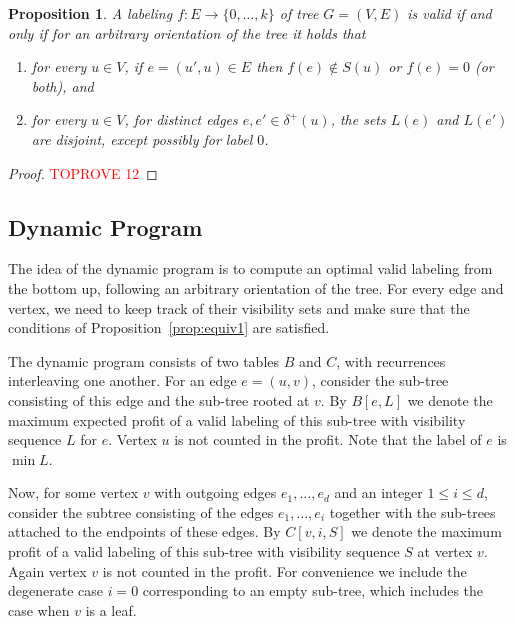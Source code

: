 \documentclass[11pt]{article}
\newtheorem{proposition}{Proposition}[section]
\newcommand\+{\mkern2mu}
\begin{document}
\begin{proposition} \label{prop: visibility}
    \label{prop:equiv1}
A labeling $f:E \to \{0, \ldots, k\}$ of tree $G=(V, E)$ is valid if and only if for an arbitrary orientation of the tree it holds that
    \begin{enumerate}
        \item for every $u \in V$, if $e=(u', u) \in E$ then $f(e) \not \in S(u)$ or $f(e) = 0$ (or both), and
        \item for every $u \in V$, for distinct edges $e, e' \in \delta^+(u)$, the sets $L(e)$ and $L(e')$ are disjoint, except possibly for label $0$.
    \end{enumerate}
\end{proposition}

\begin{proof}\textcolor{red}{TOPROVE 12}\end{proof}


\subsection{Dynamic Program}
The idea of the dynamic program is to compute an optimal valid labeling from the bottom up, following an arbitrary orientation of the tree. For every edge and vertex, we need to keep track of their visibility sets and make sure that the conditions of Proposition~\ref{prop:equiv1} are satisfied. 

The dynamic program consists of two tables $B$ and $C$, with recurrences interleaving one another. For an edge $e=(u,v)$, consider the sub-tree consisting of this edge and the sub-tree rooted at $v$. By $B[e,L]$ we denote the maximum expected profit of a valid labeling of this sub-tree with visibility sequence $L$ for $e$. Vertex $u$ is not counted in the profit. Note that the label of $e$ is $\min L$.

Now, for some vertex $v$ with outgoing edges $e_1, \ldots, e_d$ and an integer $1 \leq i \leq d$, consider the subtree consisting of the edges $e_1,\ldots,e_i$ together with the sub-trees attached to the endpoints of these edges. By $C[v,i,S]$ we denote the maximum profit of a valid labeling of this sub-tree with visibility sequence $S$ at vertex $v$. Again vertex $v$ is not counted in the profit. For convenience we include the degenerate case $i=0$ corresponding to an empty sub-tree, which includes the case when $v$ is a leaf.
\end{document}
